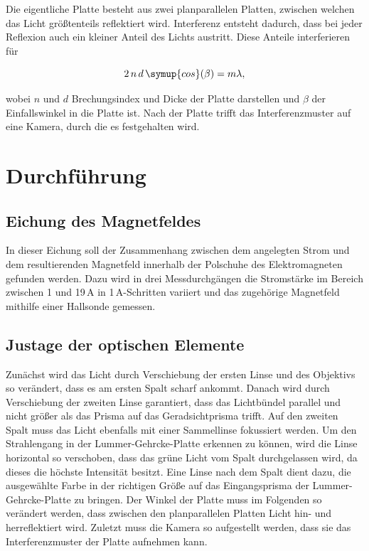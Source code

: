         Die eigentliche Platte besteht aus zwei planparallelen Platten, zwischen welchen 
        das Licht größtenteils reflektiert wird. Interferenz entsteht dadurch, dass bei jeder 
        Reflexion auch ein kleiner Anteil des Lichts austritt. Diese Anteile interferieren für 

        \begin{equation}
            2\, n\, d\, \symup{cos}(\beta) = m\lambda,
        \end{equation}

        wobei $n$ und $d$ Brechungsindex und Dicke der Platte darstellen und $\beta$ der
        Einfallswinkel in die Platte ist. Nach der Platte trifft das Interferenzmuster auf eine 
        Kamera, durch die es festgehalten wird.



\section{Durchführung}
\label{sec:Durchführung}


        \subsection{Eichung des Magnetfeldes}

            In dieser Eichung soll der Zusammenhang zwischen dem angelegten Strom und 
            dem resultierenden Magnetfeld innerhalb der Polschuhe des Elektromagneten 
            gefunden werden. Dazu wird in drei Messdurchgängen 
            die Stromstärke im Bereich zwischen 1 und 19\,A in 1\,A-Schritten variiert
            und das zugehörige Magnetfeld mithilfe einer Hallsonde gemessen.

        \subsection{Justage der optischen Elemente}

            Zunächst wird das Licht durch Verschiebung der ersten Linse und des Objektivs 
            so verändert, dass es am ersten Spalt scharf ankommt. Danach wird durch Verschiebung 
            der zweiten Linse garantiert, dass das Lichtbündel parallel und nicht größer als 
            das Prisma auf das Geradsichtprisma trifft. Auf den zweiten Spalt muss das Licht 
            ebenfalls mit einer Sammellinse fokussiert werden. Um den Strahlengang in der 
            Lummer-Gehrcke-Platte erkennen zu können, wird die Linse horizontal so verschoben, 
            dass das grüne Licht vom Spalt durchgelassen wird, da dieses die höchste Intensität 
            besitzt. Eine Linse nach dem Spalt dient dazu, die ausgewählte Farbe in der richtigen 
            Größe auf das Eingangsprisma der Lummer-Gehrcke-Platte zu bringen. Der Winkel der Platte 
            muss im Folgenden so verändert werden, dass zwischen den planparallelen Platten Licht 
            hin- und herreflektiert wird. Zuletzt muss die Kamera so aufgestellt werden, dass 
            sie das Interferenzmuster der Platte aufnehmen kann.

